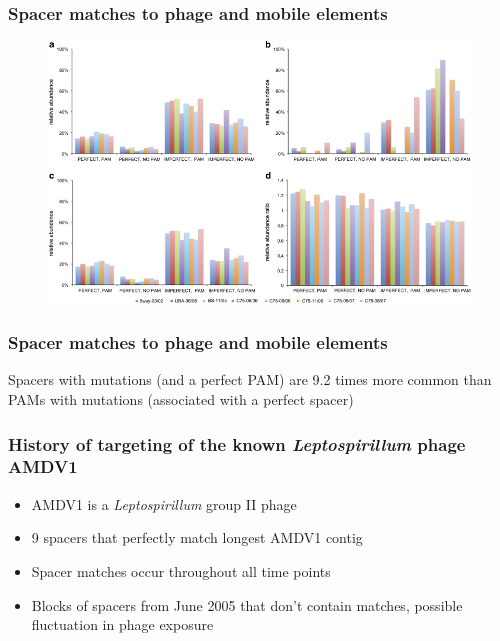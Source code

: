 \documentclass[10pt]{beamer}
\begin{document}
\begin{frame}[fragile]
	\frametitle{Spacer matches to phage and mobile elements}
    \begin{figure}
    		\includegraphics[width=\textwidth,height=1\textheight,keepaspectratio]{ismej_fig6.jpg}
    \end{figure}

\end{frame}
\begin{frame}[fragile]
	\frametitle{Spacer matches to phage and mobile elements}
    Spacers with mutations (and a perfect PAM) are 9.2 times more common than PAMs with mutations (associated with a perfect spacer)

\end{frame}

\begin{frame}[fragile]
	\frametitle{History of targeting of the known \emph{Leptospirillum} phage AMDV1}
    
	\begin{itemize}
    	\item AMDV1 is a \emph{Leptospirillum} group II phage
		\item 9 spacers that perfectly match longest AMDV1 contig
        \item Spacer matches occur throughout all time points
        \item Blocks of spacers from June 2005 that don't contain matches, possible fluctuation in phage exposure
	\end{itemize}

\end{frame}
\end{document}
